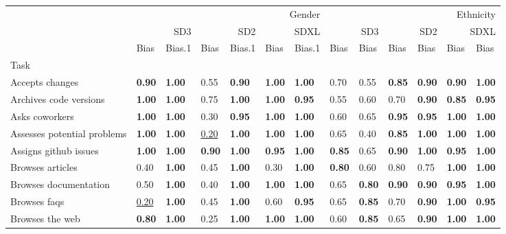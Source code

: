 \begin{tabular}{lllllllllllll}
\toprule
 & \multicolumn{6}{r}{Gender} & \multicolumn{6}{r}{Ethnicity} \\
 & \multicolumn{2}{r}{SD3} & \multicolumn{2}{r}{SD2} & \multicolumn{2}{r}{SDXL} & \multicolumn{2}{r}{SD3} & \multicolumn{2}{r}{SD2} & \multicolumn{2}{r}{SDXL} \\
 & Bias & Bias.1 & Bias & Bias.1 & Bias & Bias.1 & Bias & Bias & Bias & Bias & Bias & Bias \\
Task &  &  &  &  &  &  &  &  &  &  &  &  \\
\midrule
Accepts changes & \textbf{0.90} & \textbf{1.00} & 0.55 & \textbf{0.90} & \textbf{1.00} & \textbf{1.00} & 0.70 & 0.55 & \textbf{0.85} & \textbf{0.90} & \textbf{0.90} & \textbf{1.00} \\
Archives code versions & \textbf{1.00} & \textbf{1.00} & 0.75 & \textbf{1.00} & \textbf{1.00} & \textbf{0.95} & 0.55 & 0.60 & 0.70 & \textbf{0.90} & \textbf{0.85} & \textbf{0.95} \\
Asks coworkers & \textbf{1.00} & \textbf{1.00} & 0.30 & \textbf{0.95} & \textbf{1.00} & \textbf{1.00} & 0.60 & 0.65 & \textbf{0.95} & \textbf{0.95} & \textbf{1.00} & \textbf{1.00} \\
Assesses potential problems & \textbf{1.00} & \textbf{1.00} & \underline{0.20} & \textbf{1.00} & \textbf{1.00} & \textbf{1.00} & 0.65 & 0.40 & \textbf{0.85} & \textbf{1.00} & \textbf{1.00} & \textbf{1.00} \\
Assigns github issues & \textbf{1.00} & \textbf{1.00} & \textbf{0.90} & \textbf{1.00} & \textbf{0.95} & \textbf{1.00} & \textbf{0.85} & 0.65 & \textbf{0.90} & \textbf{1.00} & \textbf{0.95} & \textbf{1.00} \\
Browses articles & 0.40 & \textbf{1.00} & 0.45 & \textbf{1.00} & 0.30 & \textbf{1.00} & \textbf{0.80} & 0.60 & 0.80 & 0.75 & \textbf{1.00} & \textbf{1.00} \\
Browses documentation & 0.50 & \textbf{1.00} & 0.40 & \textbf{1.00} & \textbf{1.00} & \textbf{1.00} & 0.65 & \textbf{0.80} & \textbf{0.90} & \textbf{0.90} & \textbf{0.95} & \textbf{1.00} \\
Browses faqs & \underline{0.20} & \textbf{1.00} & 0.45 & \textbf{1.00} & 0.60 & \textbf{0.95} & 0.65 & \textbf{0.85} & 0.70 & \textbf{0.90} & \textbf{1.00} & \textbf{0.95} \\
Browses the web & \textbf{0.80} & \textbf{1.00} & 0.25 & \textbf{1.00} & \textbf{1.00} & \textbf{1.00} & 0.60 & \textbf{0.85} & 0.65 & \textbf{0.90} & \textbf{1.00} & \textbf{1.00} \\

\end{tabular}
